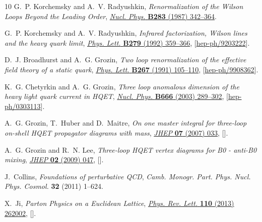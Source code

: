 \documentclass[12pt]{article}
\numberwithin{equation}{section}
\newcommand{\1}[1]{\mathbf{1}^{#1}}
\newcommand{\2}[1]{\mathbf{2}^{#1}}
\newcommand{\3}[1]{\mathbf{3}^{#1}}
\newcommand{\4}[1]{\mathbf{4}^{#1}}
\newcommand{\5}[1]{\mathbf{5}^{#1}}
\begin{document}
\begin{thebibliography}{10}
G.~P. Korchemsky and A.~V. Radyushkin, \emph{{Renormalization of the Wilson
  Loops Beyond the Leading Order}},
  \href{http://dx.doi.org/10.1016/0550-3213(87)90277-X}{\emph{Nucl. Phys.}
  {\bfseries B283} (1987) 342--364}.

G.~P. Korchemsky and A.~V. Radyushkin, \emph{{Infrared factorization, Wilson
  lines and the heavy quark limit}},
  \href{http://dx.doi.org/10.1016/0370-2693(92)90405-S}{\emph{Phys. Lett.}
  {\bfseries B279} (1992) 359--366},
  [\href{https://arxiv.org/abs/hep-ph/9203222}{{\ttfamily hep-ph/9203222}}].

D.~J. Broadhurst and A.~G. Grozin, \emph{{Two loop renormalization of the
  effective field theory of a static quark}},
  \href{http://dx.doi.org/10.1016/0370-2693(91)90532-U}{\emph{Phys. Lett.}
  {\bfseries B267} (1991) 105--110},
  [\href{https://arxiv.org/abs/hep-ph/9908362}{{\ttfamily hep-ph/9908362}}].

K.~G. Chetyrkin and A.~G. Grozin, \emph{{Three loop anomalous dimension of the
  heavy light quark current in HQET}},
  \href{http://dx.doi.org/10.1016/S0550-3213(03)00490-5}{\emph{Nucl. Phys.}
  {\bfseries B666} (2003) 289--302},
  [\href{https://arxiv.org/abs/hep-ph/0303113}{{\ttfamily hep-ph/0303113}}].

A.~G. Grozin, T.~Huber and D.~Maitre, \emph{{On one master integral for
  three-loop on-shell HQET propagator diagrams with mass}},
  \href{http://dx.doi.org/10.1088/1126-6708/2007/07/033}{\emph{JHEP} {\bfseries
  07} (2007) 033}, [\href{https://arxiv.org/abs/0705.2609}{{}}].

A.~G. Grozin and R.~N. Lee, \emph{{Three-loop HQET vertex diagrams for B0 -
  anti-B0 mixing}},
  \href{http://dx.doi.org/10.1088/1126-6708/2009/02/047}{\emph{JHEP} {\bfseries
  02} (2009) 047}, [\href{https://arxiv.org/abs/0812.4522}{{}}].

J.~Collins, \emph{{Foundations of perturbative QCD}}, {\emph{Camb. Monogr.
  Part. Phys. Nucl. Phys. Cosmol.} {\bfseries 32} (2011) 1--624}.

X.~Ji, \emph{{Parton Physics on a Euclidean Lattice}},
  \href{http://dx.doi.org/10.1103/PhysRevLett.110.262002}{\emph{Phys. Rev.
  Lett.} {\bfseries 110} (2013) 262002},
  [\href{https://arxiv.org/abs/1305.1539}{{}}].


\end{thebibliography}
\end{document}
